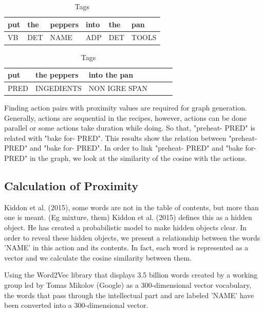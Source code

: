  \begin{table}[]
\centering
\caption{Tags}
\label{my-label}
\begin{tabular}{|l|l|l|l|l|l|}
\hline
put    & the     &  peppers  & into  & the    & pan \\ \hline
VB    & DET   & NAME     & ADP & DET & TOOLS      \\ \hline
\end{tabular}
\end{table}

 \begin{table}[]
\centering
\caption{Tags}
\label{my-label}
\begin{tabular}{|l|l|l|l|l|l|}
\hline
put       &  the peppers       & into  the pan \\ \hline
PRED  & INGEDIENTS & NON IGRE SPAN  \\ \hline
\end{tabular}
\end{table}

Finding action pairs with proximity values are required for graph generation. Generally, actions are sequential in the recipes, however, actions can be done  parallel or some actions take duration while doing. So that, "preheat- PRED" is related with "bake for- PRED". This results show the relation between "preheat- PRED" and "bake for- PRED". In order to link "preheat- PRED"  and  "bake for- PRED" in the graph,  we look at the similarity of the cosine with the actions. 




\subsection{Calculation of Proximity}
Kiddon et al. (2015), some words are not in the table of contents, but more than one is meant. (Eg mixture, them) Kiddon et al. (2015) defines this as a hidden object. He has created a probabilistic model to make hidden objects clear. In order to reveal these hidden objects, we present a relationship between the words 'NAME' in this action and its contents. In fact, each word is represented as a vector and we calculate the cosine similarity between them.

Using the Word2Vec library that displays 3.5 billion words created by a working group led by Tomas Mikolov (Google) as a 300-dimensional vector vocabulary, the words that pass through the intellectual part and are labeled 'NAME' have been converted into a 300-dimensional vector.

